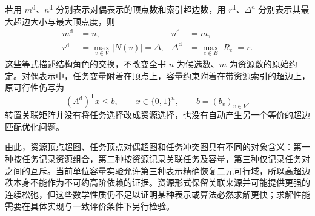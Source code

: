 若用 $m^{\mathrm d}$、$n^{\mathrm d}$ 分别表示对偶表示的顶点数和索引超边数，用 $r^{\mathrm d}$、$\Delta^{\mathrm d}$ 分别表示其最大超边大小与最大顶点度，则
\begin{align}
 m^{\mathrm d}&=n,
 & n^{\mathrm d}&=m,
 \label{s0204:dual_counts}\\
 r^{\mathrm d}&=\max_{v\in V}|N(v)|=\Delta,
 &\Delta^{\mathrm d}&=\max_{e\in E}|R_e|=r.
 \label{s0204:dual_rank_degree}
\end{align}
这些等式描述结构角色的交换，不改变全书 $n$ 为候选数、$m$ 为资源数的原始约定。对偶表示中，任务变量附着在顶点上，容量约束附着在带资源索引的超边上，原可行性仍写为
\begin{equation}
 (A^{\mathrm d})^{\mathsf T}x\leq b,
 \qquad x\in\{0,1\}^{n},
 \qquad b=(b_v)_{v\in V}.
 \label{s0204:dual_representation_capacity}
\end{equation}
转置关联矩阵并没有将任务选择改成资源选择，也没有自动产生另一个等价的超边匹配优化问题。

由此，资源顶点超图、任务顶点对偶超图和任务冲突图具有不同的对象含义：第一种按任务记录资源组合，第二种按资源记录关联任务及容量，第三种仅记录任务对之间的互斥。当前单位容量实验允许第三种表示精确恢复二元可行域，所以高超边秩本身不能作为不可约高阶依赖的证据。资源形式保留关联来源并可能提供更强的连续松弛，但这些数学性质仍不足以证明某种表示或算法必然求解更快；求解性能需要在具体实现与一致评价条件下另行检验。

